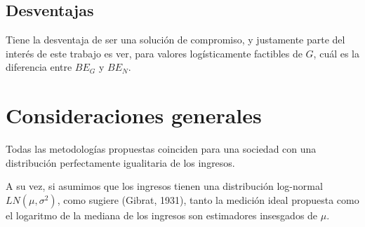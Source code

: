 \subsection{Desventajas}

Tiene la desventaja de ser una solución de compromiso, y justamente parte del interés de este trabajo es ver, para valores logísticamente factibles de $G$, cuál es la diferencia entre $BE_G$ y $BE_N$.

\section{Consideraciones generales}


Todas las metodologías propuestas coinciden para una sociedad con una distribución perfectamente igualitaria de los ingresos.

A su vez, si asumimos que los ingresos tienen una distribución log-normal $LN(\mu,\sigma^2)$, como sugiere (Gibrat, 1931)\cite{gibrat1931inégalités}, tanto la medición ideal propuesta como el logaritmo de la mediana de los ingresos son estimadores insesgados de $\mu$.